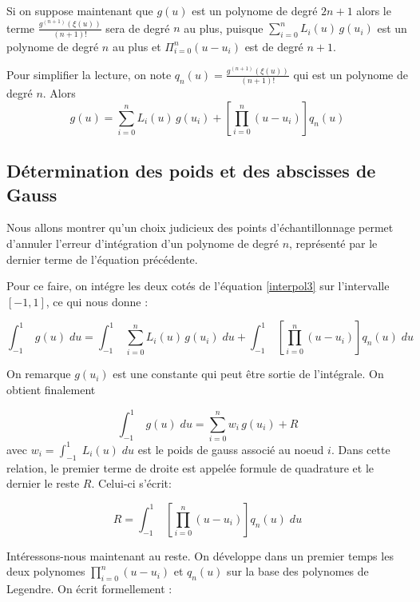 \documentclass[a4paper, 10pt]{article}
\begin{document}
Si on suppose maintenant que $g(u)$ est un polynome de degré $2n+1$ alors le terme $\frac{g^{(n+1)}(\xi(u))}{(n+1)!}$ sera
de degré $n$ au plus, puisque $ \sum_{i=0}^{n} L_i(u) \, g(u_i)$ est un polynome de degré $n$ au plus et $\Pi_{i=0}^n (u-u_i)$ 
est de degré $n+1$.

Pour simplifier la lecture, on note $q_n(u) = \frac{g^{(n+1)}(\xi(u))}{(n+1)!}$ qui est un polynome de degré $n$. Alors
\begin{equation}
g(u) =  \sum_{i=0}^{n} L_i(u) \, g(u_i) + \left[ \prod_{i=0}^n (u-u_i) \right] q_n(u)
\label{interpol3}
\end{equation}

\subsection{Détermination des poids et des abscisses de Gauss}

Nous allons montrer qu'un choix judicieux des points d'échantillonnage permet d'annuler l'erreur d'intégration d'un polynome de degré $n$,
représenté par le dernier terme de l'équation précédente.

Pour ce faire, on intégre les deux cotés de l'équation \ref{interpol3} sur l'intervalle $[-1, 1]$, ce qui nous donne :

\begin{equation}
\int_{-1}^{1}\; g(u)\; du =  \int_{-1}^{1}\;  \sum_{i=0}^{n} L_i(u) \, g(u_i) \; du+ \int_{-1}^{1}\;  \left[ \prod_{i=0}^n (u-u_i) \right] q_n(u)\; du
\label{interpol4}
\end{equation}

On remarque $g(u_i)$ est une constante qui peut être sortie de l'intégrale. On obtient finalement

\begin{equation}
\int_{-1}^{1}\; g(u)\; du =   \sum_{i=0}^{n} w_i\, g(u_i)  + R
\label{interpol5}
\end{equation}
avec $w_i =  \int_{-1}^{1}\;  L_i(u) \; du$ est le poids de gauss associé au noeud $i$.
Dans cette relation,  le premier terme de droite est appelée formule de quadrature et le dernier le reste $R$.
Celui-ci s'écrit:

\begin{equation}
R = \int_{-1}^{1}\;  \left[ \prod_{i=0}^n (u-u_i) \right] q_n(u)\; du
\label{reste}
\end{equation}

Intéressons-nous maintenant au reste.
On développe dans un premier temps les deux polynomes $ \prod_{i=0}^n (u-u_i)$ et $q_n(u)$ sur la base des polynomes
de Legendre. On écrit formellement :
\end{document}
